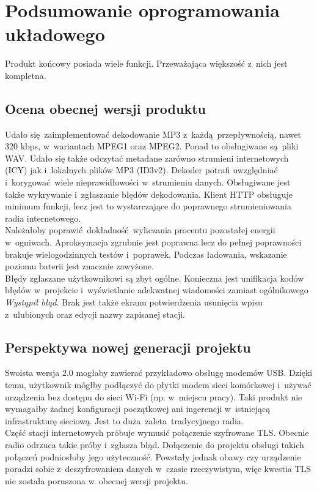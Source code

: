 \documentclass[polish]{aghengthesis}
\begin{document}
	\section{Podsumowanie oprogramowania układowego}
		Produkt końcowy posiada wiele funkcji. Przeważająca większość z~nich jest kompletna.
		
		\subsection{Ocena obecnej wersji produktu}
			Udało się zaimplementować dekodowanie MP3 z~każdą przepływnością, nawet 320 kbps, w~wariantach MPEG1 oraz MPEG2. Ponad to obsługiwane są pliki WAV. Udało się także odczytać metadane zarówno strumieni internetowych (ICY) jak i~lokalnych plików MP3 (ID3v2). Dekoder potrafi uwzględniać i~korygować wiele nieprawidłowości w~strumieniu danych. Obsługiwane jest także wykrywanie i~zgłaszanie błędów dekodowania. Klient HTTP obsługuje minimum funkcji, lecz jest to wystarczające do poprawnego strumieniowania radia internetowego.
			$ $\\
			
			Należałoby poprawić dokładność wyliczania procentu pozostałej energii w~ogniwach. Aproksymacja zgrubnie jest poprawna lecz do pełnej poprawności brakuje wielogodzinnych testów i~poprawek. Podczas ładowania, wskazanie poziomu baterii jest znacznie zawyżone.
			$ $\\
			
			Błędy zgłaszane użytkownikowi są zbyt ogólne. Konieczna jest unifikacja kodów błędów w~projekcie i~wyświetlanie adekwatnej wiadomości zamiast ogólnikowego \textit{Wystąpił błąd}. Brak jest także ekranu potwierdzenia usunięcia wpisu z~ulubionych oraz edycji nazwy zapisanej stacji.
		
		\subsection{Perspektywa nowej generacji projektu}
			Swoista wersja 2.0 mogłaby zawierać przykładowo obsługę modemów USB. Dzięki temu, użytkownik mógłby podłączyć do płytki modem sieci komórkowej i~używać urządzenia bez dostępu do sieci Wi-Fi (np. w~miejscu pracy). Taki produkt nie wymagałby żadnej konfiguracji początkowej ani ingerencji w~istniejącą infrastrukturę sieciową. Jest to duża zaleta tradycyjnego radia.
			$ $\\
			
			Część stacji internetowych próbuje wymusić połączenie szyfrowane TLS. Obecnie radio odrzuca takie próby i~zgłasza błąd. Dołączenie do projektu obsługi takich połączeń podniosłoby jego użyteczność. Powstały jednak obawy czy urządzenie poradzi sobie z~deszyfrowaniem danych w~czasie rzeczywistym, więc kwestia TLS nie została poruszona w~obecnej wersji projektu.
			$ $\\
			
\end{document}
